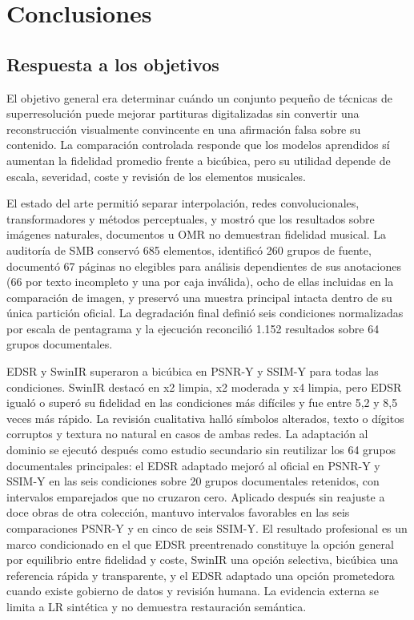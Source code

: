 \chapter{Conclusiones}

\section{Respuesta a los objetivos}
El objetivo general era determinar cuándo un conjunto pequeño de técnicas de superresolución puede
mejorar partituras digitalizadas sin convertir una reconstrucción visualmente convincente en una
afirmación falsa sobre su contenido. La comparación controlada responde que los modelos aprendidos
sí aumentan la fidelidad promedio frente a bicúbica, pero su utilidad depende de escala, severidad,
coste y revisión de los elementos musicales.

El estado del arte permitió separar interpolación, redes convolucionales, transformadores y métodos
perceptuales, y mostró que los resultados sobre imágenes naturales, documentos u OMR no demuestran
fidelidad musical. La auditoría de SMB conservó 685 elementos, identificó 260 grupos de fuente,
documentó 67 páginas no elegibles para análisis dependientes de sus anotaciones (66 por texto
incompleto y una por caja inválida), ocho de ellas incluidas en la comparación de imagen, y preservó una muestra
principal intacta dentro de su única partición oficial. La degradación final definió seis condiciones normalizadas por
escala de pentagrama y la ejecución reconcilió 1.152 resultados sobre 64 grupos documentales.

EDSR y SwinIR superaron a bicúbica en PSNR-Y y SSIM-Y para todas las condiciones. SwinIR destacó en
x2 limpia, x2 moderada y x4 limpia, pero EDSR igualó o superó su fidelidad en las condiciones más
difíciles y fue entre 5,2 y 8,5 veces más rápido. La revisión cualitativa halló símbolos alterados,
texto o dígitos corruptos y textura no natural en casos de ambas redes. La adaptación al dominio se
ejecutó después como estudio secundario sin reutilizar los 64 grupos documentales principales: el EDSR adaptado
mejoró al oficial en PSNR-Y y SSIM-Y en las seis condiciones sobre 20 grupos documentales retenidos, con intervalos
emparejados que no cruzaron cero. Aplicado después sin reajuste a doce obras de otra colección,
mantuvo intervalos favorables en las seis comparaciones PSNR-Y y en cinco de seis SSIM-Y. El
resultado profesional es un marco condicionado en el que EDSR preentrenado constituye la opción
general por equilibrio entre fidelidad y coste, SwinIR una opción selectiva, bicúbica una referencia
rápida y transparente, y el EDSR adaptado una opción prometedora cuando existe gobierno de datos y
revisión humana. La evidencia externa se limita a LR sintética y no demuestra restauración
semántica.

